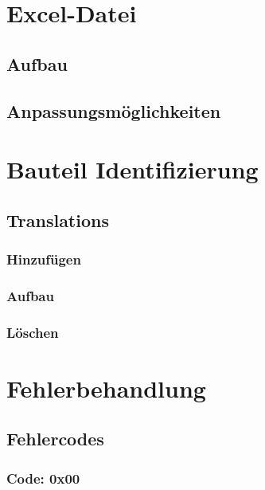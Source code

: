 \documentclass{book}
\begin{document}
	\chapter{Excel-Datei}
		\section{Aufbau}
		\section{Anpassungsmöglichkeiten}
	\chapter{Bauteil Identifizierung}
		\section{Translations} \label{Translations}
			\subsection{Hinzufügen}
			\subsection{Aufbau}
			\subsection{Löschen}
	\chapter{Fehlerbehandlung}
		\section{Fehlercodes}
			\subsection*{Code: 0x00}
\end{document}
